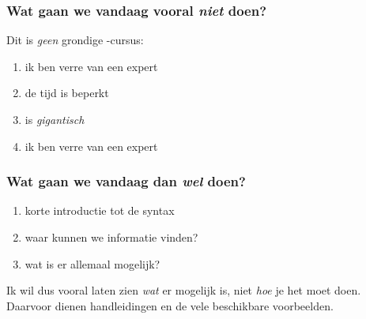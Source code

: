 \begin{frame}
  \frametitle{Wat gaan we vandaag vooral \emph{niet} doen?}

  Dit is \emph{geen} grondige \TikZ-cursus:
  \begin{enumerate}
    \item ik ben verre van een expert
    \item de tijd is beperkt
    \item \TikZ is \emph{gigantisch}
    \item\pause ik ben verre van een expert
  \end{enumerate}
\end{frame}

\begin{frame}
  \frametitle{Wat gaan we vandaag dan \emph{wel} doen?}

  \begin{enumerate}
    \item korte introductie tot de syntax
    \item waar kunnen we informatie vinden?
    \item wat is er allemaal mogelijk?
  \end{enumerate}
  Ik wil dus vooral laten zien \emph{wat} er mogelijk is, niet \emph{hoe} je het moet doen. Daarvoor dienen handleidingen en de vele beschikbare voorbeelden.
\end{frame}

